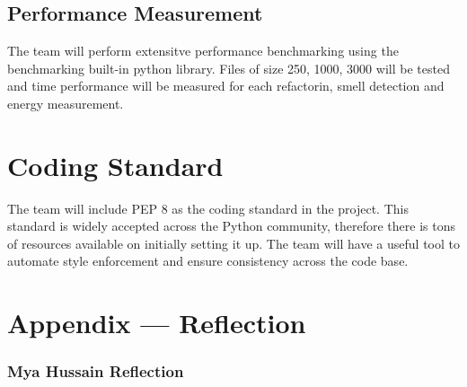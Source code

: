 \documentclass{article}
\begin{document}
\subsection{Performance Measurement}
The team will perform extensitve performance benchmarking using the benchmarking built-in python library. Files of size 250, 1000, 3000 will be tested and time performance will be measured for each refactorin, smell detection and energy measurement.

\section{Coding Standard}

The team will include PEP 8 as the coding standard in the project.
This standard is widely accepted across the Python community,
therefore there is tons of resources available on initially setting
it up. The team will have a useful tool to automate style enforcement
and ensure consistency across the code base.

\newpage{}

\section*{Appendix --- Reflection}

\subsubsection*{Mya Hussain Reflection}
\end{document}
